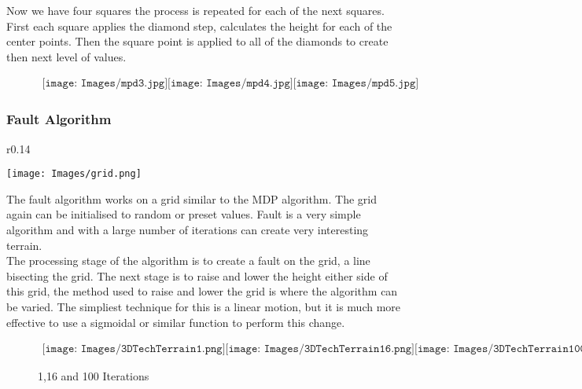 Now we have four squares the process is repeated for each of the next squares. First
each square applies the diamond step, calculates the height for each of the center 
points. Then the square point is applied to all of the diamonds to create then next
level of values.\\

\begin{figure}[h!]
\begin{center}$
\begin{array}{cc}
\texttt{[image: Images/mpd3.jpg]}
\texttt{[image: Images/mpd4.jpg]}
\texttt{[image: Images/mpd5.jpg]}
\end{array}$
\end{center}
\end{figure}

\subsubsection*{Fault Algorithm}

\begin{wrapfigure}{r}{0.14\textwidth}
	\vspace{-40pt}
	\begin{center}
		\texttt{[image: Images/grid.png]}
	\end{center}
\end{wrapfigure}
The fault algorithm works on a grid similar to the MDP algorithm. The grid again can
be initialised to random or preset values. Fault is a very simple algorithm and with
a large number of iterations can create very interesting terrain. \\

The processing stage of the algorithm is to create a fault on the grid, a line 
bisecting the grid. The next stage is to raise and lower the height either side of
this grid, the method used to raise and lower the grid is where the algorithm can be 
varied. The simpliest technique for this is a linear motion, but it is much more 
effective to use a sigmoidal or similar function to perform this change.\\

\begin{figure}[h!]
	\begin{center}$
		\begin{array}{cc}
			\texttt{[image: Images/3DTechTerrain1.png]}
			\texttt{[image: Images/3DTechTerrain16.png]}
			\texttt{[image: Images/3DTechTerrain100.png]}
		\end{array}$
	\end{center}
	\caption{1,16 and 100 Iterations}
\end{figure}

